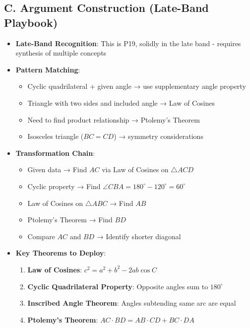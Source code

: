 \documentclass[11pt]{article}
\begin{document}
\begin{strategicbox}
\subsection*{C. Argument Construction (Late-Band Playbook)}
\begin{itemize}[leftmargin=*]
    \item \textbf{Late-Band Recognition}: This is P19, solidly in the late band - requires synthesis of multiple concepts
    
    \item \textbf{Pattern Matching}: 
    \begin{itemize}
        \item Cyclic quadrilateral + given angle → use supplementary angle property
        \item Triangle with two sides and included angle → Law of Cosines
        \item Need to find product relationship → Ptolemy's Theorem
        \item Isosceles triangle ($BC = CD$) → symmetry considerations
    \end{itemize}
    
    \item \textbf{Transformation Chain}: 
    \begin{itemize}
        \item Given data → Find $AC$ via Law of Cosines on $\triangle ACD$
        \item Cyclic property → Find $\angle CBA = 180^\circ - 120^\circ = 60^\circ$
        \item Law of Cosines on $\triangle ABC$ → Find $AB$
        \item Ptolemy's Theorem → Find $BD$
        \item Compare $AC$ and $BD$ → Identify shorter diagonal
    \end{itemize}
    
    \item \textbf{Key Theorems to Deploy}:
    \begin{enumerate}
        \item \textbf{Law of Cosines}: $c^2 = a^2 + b^2 - 2ab\cos C$
        \item \textbf{Cyclic Quadrilateral Property}: Opposite angles sum to $180^\circ$
        \item \textbf{Inscribed Angle Theorem}: Angles subtending same arc are equal
        \item \textbf{Ptolemy's Theorem}: $AC \cdot BD = AB \cdot CD + BC \cdot DA$
    \end{enumerate}
\end{itemize}
\end{strategicbox}
\end{document}
